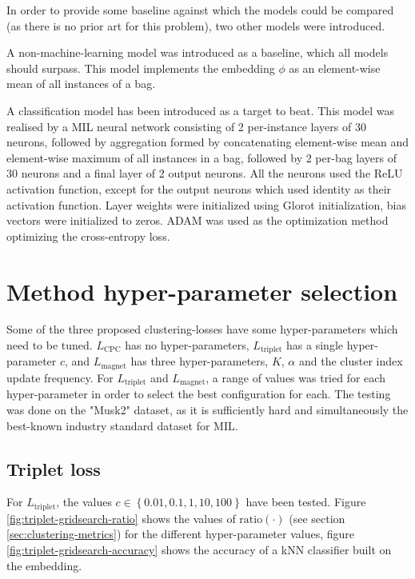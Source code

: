 In order to provide some baseline against which the models could be compared (as there is no prior art for this problem), two other models were introduced.

A non-machine-learning model was introduced as a baseline, which all models should surpass. This model implements the embedding \( \phi \) as an element-wise mean of all instances of a bag.

A classification model has been introduced as a target to beat. This model was realised by a MIL neural network consisting of 2 per-instance layers of 30 neurons, followed by aggregation formed by concatenating element-wise mean and element-wise maximum of all instances in a bag, followed by 2 per-bag layers of 30 neurons and a final layer of 2 output neurons. All the neurons used the ReLU activation function, except for the output neurons which used identity as their activation function. Layer weights were initialized using Glorot initialization, bias vectors were initialized to zeros. ADAM was used as the optimization method optimizing the cross-entropy loss.

\section{Method hyper-parameter selection}

Some of the three proposed clustering-losses have some hyper-parameters which need to be tuned. \( L_\mathrm{CPC} \) has no hyper-parameters, \( L_\mathrm{triplet} \) has a single hyper-parameter \( c \), and \( L_\mathrm{magnet} \) has three hyper-parameters, \( K \), \( \alpha \) and the cluster index update frequency. For \( L_\mathrm{triplet} \) and \( L_\mathrm{magnet} \), a range of values was tried for each hyper-parameter in order to select the best configuration for each. The testing was done on the "Musk2" dataset, as it is sufficiently hard and simultaneously the best-known industry standard dataset for MIL.

\subsection{Triplet loss}
For \( L_\mathrm{triplet} \), the values \( c \in \left\{ 0.01, 0.1, 1, 10, 100 \right\} \) have been tested. Figure \ref{fig:triplet-gridsearch-ratio} shows the values of \( \mathrm{ratio} \left( \cdot \right) \) (see section \ref{sec:clustering-metrics}) for the different hyper-parameter values, figure \ref{fig:triplet-gridsearch-accuracy} shows the accuracy of a kNN classifier built on the embedding.

